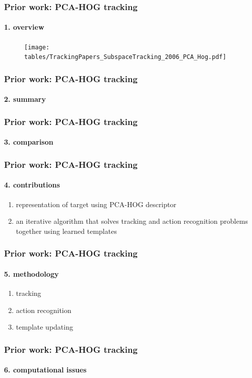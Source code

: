 \begin{frame}
\frametitle{Prior work: PCA-HOG tracking}
\framesubtitle{1. overview}
\logoCSIPCPL\mypagenum
	\begin{figure}
		\texttt{[image: tables/TrackingPapers\_SubspaceTracking\_2006\_PCA\_Hog.pdf]}
	\end{figure}
\end{frame}



\begin{frame}
\frametitle{Prior work: PCA-HOG tracking}
\framesubtitle{2. summary}
\logoCSIPCPL\mypagenum
{}
\end{frame}


\begin{frame}
\frametitle{Prior work: PCA-HOG tracking}
\framesubtitle{3. comparison}
\logoCSIPCPL\mypagenum		
{}
\end{frame}



\begin{frame}
\frametitle{Prior work: PCA-HOG tracking}
\framesubtitle{4. contributions}
\logoCSIPCPL\mypagenum
{}
	\begin{enumerate}
		\item representation of target using PCA-HOG descriptor
		\item an iterative algorithm that solves tracking and action recognition problems together using learned templates
	\end{enumerate}
\end{frame}


\begin{frame}
\frametitle{Prior work: PCA-HOG tracking}
\framesubtitle{5. methodology}
\logoCSIPCPL\mypagenum
{}
	\begin{enumerate}
		\item tracking
		\item action recognition
		\item template updating
	\end{enumerate}
\end{frame}


\begin{frame}
\frametitle{Prior work: PCA-HOG tracking}
\framesubtitle{6. computational issues}
\logoCSIPCPL\mypagenum
{}
\end{frame}



